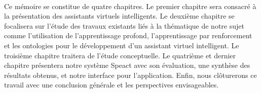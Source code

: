 \paragraph{}
Ce mémoire se constitue de quatre chapitres. Le premier chapitre sera consacré à la présentation des assistants virtuels intelligents. Le deuxième chapitre se focalisera sur l'étude des travaux existants liés à la thématique de notre sujet comme l'utilisation de l'apprentissage profond, l'apprentissage par renforcement et les ontologies pour le développement d'un assistant virtuel intelligent. Le troisième chapitre traitera de l'étude conceptuelle. Le quatrième et dernier chapitre présentera notre système Speact avec son évaluation, une synthèse des résultats obtenus, et notre interface pour l'application. Enfin, nous clôturerons ce travail avec une conclusion générale et les perspectives envisageables.
